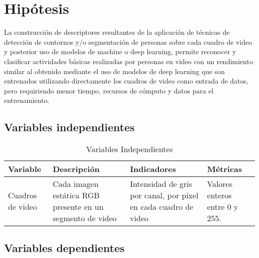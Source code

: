 
\chapter{Hipótesis} \label{Hyphotesis}

La construcción de descriptores resultantes de la aplicación de técnicas de detección de contornos y/o segmentación de personas sobre cada cuadro de video y posterior uso de modelos de machine o deep learning, permite reconocer y clasificar actividades básicas realizadas por personas en video con un rendimiento similar al obtenido mediante el uso de modelos de deep learning que son entrenados utilizando directamente los cuadros de video como entrada de datos, pero requiriendo menor tiempo, recursos de cómputo y datos para el entrenamiento.

\section{Variables independientes}

\begin{table}[ht]
	\renewcommand{\arraystretch}{1.3}
	\centering
	\begin{tabular}{>{\centering}m{}>{\raggedright}m{}m{}m{}} \hline
		\rowcolor{TableShade}
		\hline
		\textbf{Variable}  & \textbf{Descripción} & \textbf{Indicadores} & \textbf{Métricas} \\ \hline 
		Cuadros de video & Cada imagen estática RGB presente en un segmento de video & Intensidad de gris por canal, por píxel en cada cuadro de video & Valores enteros entre 0 y 255. \\ \hline
	\end{tabular}
	\caption{Variables Independientes}
	\label{tab:VarIndep}
\end{table}

\section{Variables dependientes}

